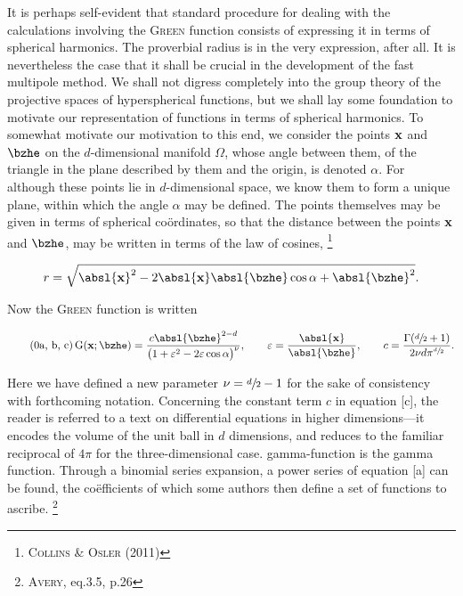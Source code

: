 It is perhaps self-evident that standard procedure for dealing with the calculations involving the \textsc{Green} function consists of expressing it in terms of spherical harmonics.
The proverbial radius is in the very expression, after all.
It is nevertheless the case that it shall be crucial in the development of the fast multipole method.
We shall not digress completely into the group theory of the projective spaces of hyperspherical functions, but we shall lay some foundation to motivate our representation of functions in terms of spherical harmonics.
To somewhat motivate our motivation to this end, we consider the points $\mathbf{x}$ and $\bzhe$ on the $d$-dimensional manifold $\Omega$, whose angle between them, of the triangle in the plane described by them and the origin, is denoted $\alpha$.
For although these points lie in $d$-dimensional space, we know them to form a unique plane, within which the angle $\alpha$ may be defined.
The points themselves may be given in terms of spherical coördinates, so that the distance between the points $\mathbf{x}$ and $\bzhe$, may be written in terms of the law of cosines,%
\footnote{%
  \cite{collins2011law} \textsc{Collins} \& \textsc{Osler} (2011)
}

\begin{equation}\label{eq:law_of_cosines}
  r = \sqrt{\absl{\xvec}^2 - 2\absl{\xvec}\absl{\bzhe}\cos{\alpha} + \absl{\bzhe}^2}.
\end{equation}

\noindent
Now the \textsc{Green} function is written

\begin{subequations}\label{eq:hypersphere_green}
  \begin{equation}\tag{\theequation{a, b, c}}
    \green(\xvec; \bzhe) = \frac{c \absl{\bzhe}^{2-d}}{{\big( 1 + \varepsilon^2 - 2\varepsilon\cos{\alpha} \big)}^{\nu}}, \qquad \varepsilon = \frac{\absl{\xvec}}{\absl{\bzhe}}, \qquad c = \frac{\Gamma(\sfrac{d}{2} + 1)}{2\nu d \pi^{\sfrac{d}{2}}}.
  \end{equation}
\end{subequations}

\noindent
Here we have defined a new parameter $\nu = \sfrac{d}{2}-1$ for the sake of consistency with forthcoming notation.
Concerning the constant term $c$ in equation \subeqref{\ref{eq:hypersphere_green}}[c], the reader is referred to a text on differential equations in higher dimensions---it encodes the volume of the unit ball in $d$ dimensions, and reduces to the familiar reciprocal of $4\pi$ for the three-dimensional case.
\gls{gamma-function} is the gamma function.
Through a binomial series expansion, a power series of equation \subeqref{\ref{eq:hypersphere_green}}[a] can be found, the coëfficients of which some authors then define a set of functions to ascribe.%
\footnote{%
  \cite{avery1989hyperspherical} \textsc{Avery}, eq.3.5, p.26
}

